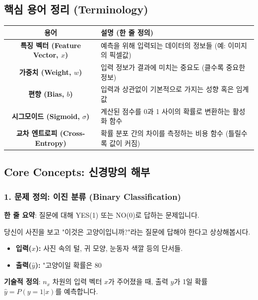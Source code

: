 \documentclass[11pt,a4paper]{book}
\theoremstyle{definition}
\begin{document}
\subsection{핵심 용어 정리 (Terminology)}
\begin{center}
\begin{tabular}{|c|l|}
\hline
\textbf{용어} & \textbf{설명 (한 줄 정의)} \\
\hline
\textbf{특징 벡터 (Feature Vector, $x$)} & 예측을 위해 입력되는 데이터의 정보들 (예: 이미지의 픽셀값) \\
\hline
\textbf{가중치 (Weight, $w$)} & 입력 정보가 결과에 미치는 중요도 (클수록 중요한 정보) \\
\hline
\textbf{편향 (Bias, $b$)} & 입력과 상관없이 기본적으로 가지는 성향 혹은 임계값 \\
\hline
\textbf{시그모이드 (Sigmoid, $\sigma$)} & 계산된 점수를 0과 1 사이의 확률로 변환하는 활성화 함수 \\
\hline
\textbf{교차 엔트로피 (Cross-Entropy)} & 확률 분포 간의 차이를 측정하는 비용 함수 (틀릴수록 값이 커짐) \\
\hline
\end{tabular}
\end{center}

\subsection{Core Concepts: 신경망의 해부}

\subsubsection{1. 문제 정의: 이진 분류 (Binary Classification)}
\textbf{한 줄 요약}: 질문에 대해 YES(1) 또는 NO(0)로 답하는 문제입니다.

\begin{analogybox}[title={고양이 탐지기}]
당신이 사진을 보고 "이것은 고양이입니까?"라는 질문에 답해야 한다고 상상해봅시다.
\begin{itemize}
    \item \textbf{입력($x$):} 사진 속의 털, 귀 모양, 눈동자 색깔 등의 단서들.
    \item \textbf{출력($\hat{y}$):} "고양이일 확률은 80%
\end{itemize}
\end{analogybox}

\textbf{기술적 정의}:
$n_x$ 차원의 입력 벡터 $x$가 주어졌을 때, 출력 $y$가 1일 확률 $\hat{y} = P(y=1 | x)$를 예측합니다.
\end{document}
